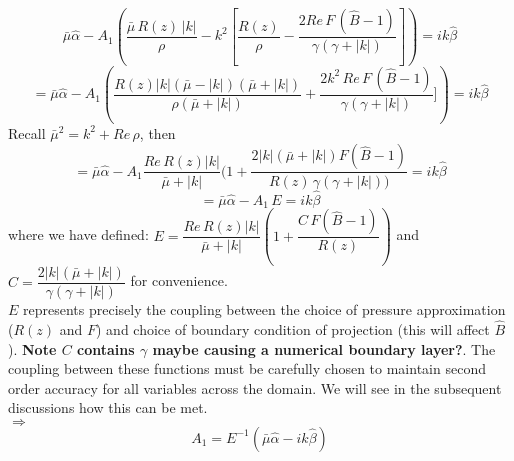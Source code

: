 \begin{equation*}
\bar{\mu} \hat{\alpha} - A_1 (\dfrac{\bar{\mu} \, R(z) \, |k|}{\rho} - k^2 [\dfrac{R(z)}{\rho} - \dfrac{2 Re \, F \, (\hat{B} - 1)}{\gamma (\gamma + |k|)}]) = ik \hat{\beta}
\end{equation*}
\begin{equation*}
= \bar{\mu} \hat{\alpha} - A_1 (\dfrac{R(z) |k| (\bar{\mu} - |k|) (\bar{\mu} + |k|)}{\rho (\bar{\mu} + |k|)} + \dfrac{2 k^2 \, Re \, F \, (\hat{B} - 1)}{\gamma (\gamma + |k|)}]) = ik \hat{\beta}
\end{equation*}
Recall $\bar{\mu}^2 = k^2 + Re \, \rho$, then
\begin{equation*}
= \bar{\mu} \hat{\alpha} - A_1 \dfrac{Re \, R(z) |k|}{\bar{\mu} + |k|} (1 + \dfrac{2 |k|(\bar{\mu} + |k|)F(\hat{B} - 1)}{R(z) \, \gamma (\gamma + |k|))} = ik \hat{\beta}
\end{equation*}
\begin{equation*}
= \bar{\mu} \hat{\alpha} - A_1 \, E = ik \hat{\beta}
\end{equation*}
where we have defined: $E =  \dfrac{Re \, R(z) |k|}{\bar{\mu} + |k|}(1 + \dfrac{C \, F(\hat{B} - 1)}{R(z)})$ and $C = \dfrac{2 |k|(\bar{\mu} + |k|)}{\gamma (\gamma + |k|)}$ for convenience.\\
$E$ represents precisely the coupling between the choice of pressure approximation ($R(z)$ and $F$) and choice of boundary condition of projection (this will affect $\hat{B}$). \textbf{Note $C$ contains $\gamma$ maybe causing a numerical boundary layer?}. The coupling between these functions must be carefully chosen to maintain second order accuracy for all variables across the domain. We will see in the subsequent discussions how this can be met.\\

$\Rightarrow$
\begin{equation}
A_1 = E^{-1} (\bar{\mu} \hat{\alpha} - ik \hat{\beta})
\end{equation}

